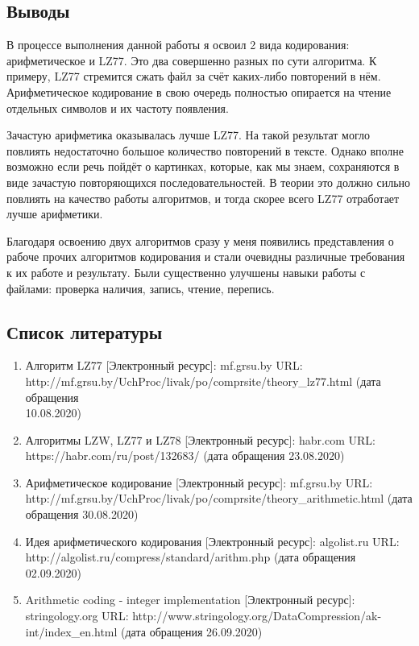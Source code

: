\documentclass[12pt]{article}
\begin{document}
\subsection*{Выводы}%

В процессе выполнения данной работы я освоил 2 вида кодирования: арифметическое и LZ77. Это два совершенно разных по сути алгоритма. К примеру, LZ77 стремится сжать файл за счёт каких-либо повторений в нём. Арифметическое кодирование в свою очередь полностью опирается на чтение отдельных символов и их частоту появления. 

Зачастую арифметика оказывалась лучше LZ77. На такой результат могло повлиять недостаточно большое количество повторений в тексте. Однако вполне возможно если речь пойдёт о картинках, которые, как мы знаем, сохраняются в виде зачастую повторяющихся последовательностей. В теории это должно сильно повлиять на качество работы алгоритмов, и тогда скорее всего LZ77 отработает лучше арифметики.

Благодаря освоению двух алгоритмов сразу у меня появились представления о рабоче прочих алгоритмов кодирования и стали очевидны различные требования к их работе и результату. Были существенно улучшены навыки работы с файлами: проверка наличия, запись, чтение, перепись.

\subsection*{Список литературы}
\begin{enumerate}
	\item Алгоритм LZ77 [Электронный ресурс]: mf.grsu.by URL:\\ http://mf.grsu.by/UchProc/livak/po/comprsite/theory\_lz77.html (дата обращения\\ 10.08.2020)
	\item Алгоритмы LZW, LZ77 и LZ78 [Электронный ресурс]: habr.com URL:\\ https://habr.com/ru/post/132683/ (дата обращения 23.08.2020)
	\item Арифметическое кодирование [Электронный ресурс]: mf.grsu.by URL:\\ http://mf.grsu.by/UchProc/livak/po/comprsite/theory\_arithmetic.html (дата обращения 30.08.2020)
	\item Идея арифметического кодирования [Электронный ресурс]: algolist.ru URL:\\ http://algolist.ru/compress/standard/arithm.php (дата обращения 02.09.2020)
	\item Arithmetic coding - integer implementation [Электронный ресурс]: stringology.org URL: http://www.stringology.org/DataCompression/ak-int/index\_en.html (дата обращения 26.09.2020)
\end{enumerate}
\end{document}
